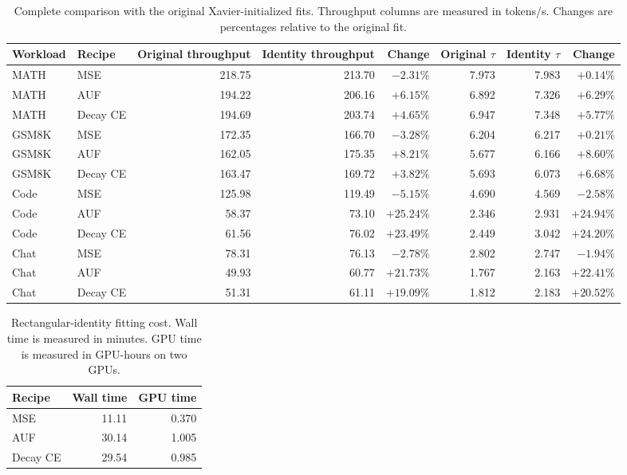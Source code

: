 \begin{table}[htbp]
\centering
\caption{Complete comparison with the original Xavier-initialized fits. Throughput columns are measured in tokens/s. Changes are percentages relative to the original fit.}
\label{tab:app-identity-change}
\scriptsize
\begin{tabular}{llrrrrrr}
\toprule
Workload & Recipe & Original throughput & Identity throughput & Change & Original $\tau$ & Identity $\tau$ & Change \\
\midrule
MATH & MSE & 218.75 & 213.70 & $-2.31\%$ & 7.973 & 7.983 & $+0.14\%$ \\
MATH & AUF & 194.22 & 206.16 & $+6.15\%$ & 6.892 & 7.326 & $+6.29\%$ \\
MATH & Decay CE & 194.69 & 203.74 & $+4.65\%$ & 6.947 & 7.348 & $+5.77\%$ \\
GSM8K & MSE & 172.35 & 166.70 & $-3.28\%$ & 6.204 & 6.217 & $+0.21\%$ \\
GSM8K & AUF & 162.05 & 175.35 & $+8.21\%$ & 5.677 & 6.166 & $+8.60\%$ \\
GSM8K & Decay CE & 163.47 & 169.72 & $+3.82\%$ & 5.693 & 6.073 & $+6.68\%$ \\
Code & MSE & 125.98 & 119.49 & $-5.15\%$ & 4.690 & 4.569 & $-2.58\%$ \\
Code & AUF & 58.37 & 73.10 & $+25.24\%$ & 2.346 & 2.931 & $+24.94\%$ \\
Code & Decay CE & 61.56 & 76.02 & $+23.49\%$ & 2.449 & 3.042 & $+24.20\%$ \\
Chat & MSE & 78.31 & 76.13 & $-2.78\%$ & 2.802 & 2.747 & $-1.94\%$ \\
Chat & AUF & 49.93 & 60.77 & $+21.73\%$ & 1.767 & 2.163 & $+22.41\%$ \\
Chat & Decay CE & 51.31 & 61.11 & $+19.09\%$ & 1.812 & 2.183 & $+20.52\%$ \\
\bottomrule
\end{tabular}
\end{table}

\begin{table}[htbp]
\centering
\caption{Rectangular-identity fitting cost. Wall time is measured in minutes. GPU time is measured in GPU-hours on two GPUs.}
\label{tab:app-identity-fit}
\small
\begin{tabular}{lrr}
\toprule
Recipe & Wall time & GPU time \\
\midrule
MSE & 11.11 & 0.370 \\
AUF & 30.14 & 1.005 \\
Decay CE & 29.54 & 0.985 \\
\bottomrule
\end{tabular}
\end{table}

